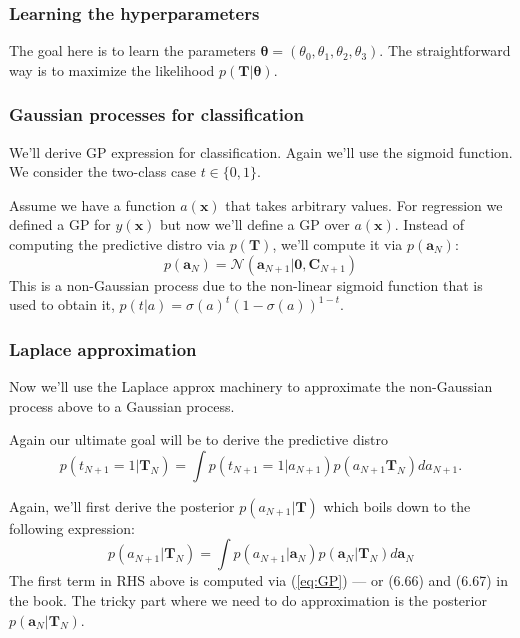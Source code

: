 \documentclass[a4paper]{article}
\newcommand{\mb}{\mathbf}
\newcommand{\bs}{\boldsymbol}
\begin{document}
\subsubsection{Learning the hyperparameters}
The goal here is to learn the parameters $\bs{\theta}=(\theta_0,\theta_1,\theta_2,\theta_3)$. The straightforward way is to maximize the likelihood $p(\mb{T}|\bs{\theta})$.
 
\subsubsection{Gaussian processes for classification}
We'll derive GP expression for classification. Again we'll use the sigmoid function. We consider the two-class case $t\in\{0,1\}$. 

Assume we have a function $a(\mb{x})$ that takes arbitrary values. For regression we defined a GP for $y(\mb{x})$ but now we'll define a GP over $a(\mb{x})$. Instead of computing the predictive distro via $p(\mb{T})$, we'll compute it via $p(\mb{a}_N)$:
%
\begin{equation}
p(\mb{a}_N) = \mathcal{N}(\mb{a}_{N+1}|\mb{0}, \mb{C}_{N+1})
\label{eq:GP_cls}
\end{equation}
%
This is a non-Gaussian process due to the non-linear sigmoid function that is used to obtain it, $p(t|a)=\sigma(a)^t (1-\sigma(a))^{1-t}$.

\subsubsection{Laplace approximation}
Now we'll use the Laplace approx machinery to approximate the non-Gaussian process above to a Gaussian process.

Again our ultimate goal will be to derive the predictive distro 
\begin{equation}
p(t_{N+1}=1|\mb{T}_N)=\int p(t_{N+1}=1|a_{N+1})p(a_{N+1}\mb{T}_N)d a_{N+1}.
\end{equation}

Again, we'll first derive the posterior $p(a_{N+1}|\mb{T})$ which boils down to the following expression:
%
\begin{equation}
p(a_{N+1}|\mb{T}_N) = \int p(a_{N+1}|\mb{a}_N)p(\mb{a}_N|\mb{T}_N) d\mb{a}_N 
\label{eq:GP_post_cls}
\end{equation}
%
The first term in RHS above is computed via (\ref{eq:GP}) \---- or (6.66) and (6.67) in the book. The tricky part where we need to do approximation is the posterior $p(\mb{a}_{N}|\mb{T}_{N})$.
\end{document}
